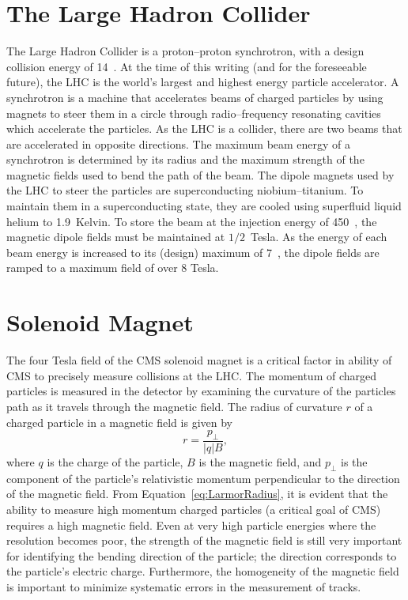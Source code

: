 \section{The Large Hadron Collider}
The Large Hadron Collider is a proton--proton synchrotron, with a design
collision energy of 14~\TeV.  At the time of this writing (and for the
foreseeable future), the LHC is the world's largest and highest energy particle
accelerator. A synchrotron is a machine that accelerates beams of charged
particles by using magnets to steer them in a circle through radio--frequency
resonating cavities which accelerate the particles. As the LHC is a collider,
there are two beams that are accelerated in opposite directions.  The maximum
beam energy of a synchrotron is determined by its radius and the maximum
strength of the magnetic fields used to bend the path of the beam.  The dipole
magnets used by the LHC to steer the particles are superconducting
niobium--titanium.  To maintain them in a superconducting state, they are cooled
using superfluid liquid helium to 1.9~Kelvin.  To store the beam at the
injection energy of 450~\GeV, the magnetic dipole fields must be maintained at
$1/2$~Tesla.  As the energy of each beam energy is increased to its (design)
maximum of 7~\TeV, the dipole fields are ramped to a maximum field of over 8
Tesla.
\section{Solenoid Magnet}
The four Tesla field of the CMS solenoid magnet is a critical factor in ability
of CMS to precisely measure collisions at the LHC\@. The momentum of charged
particles is measured in the detector by examining the curvature of the
particles path as it travels through the magnetic field.  The radius of
curvature $r$ of a charged particle in a magnetic field is given by
\begin{equation}
  r = \frac{p_\perp}{|q| B},
  \label{eq:LarmorRadius}
\end{equation}
where $q$ is the charge of the particle, $B$ is the magnetic field, and
$p_\perp$ is the component of the particle's relativistic momentum perpendicular
to the direction of the magnetic field.  From Equation~\ref{eq:LarmorRadius}, it
is evident that the ability to measure high momentum charged particles (a
critical goal of CMS) requires a high magnetic field.  Even at very high
particle energies where the resolution becomes poor, the strength of the
magnetic field is still very important for identifying the bending direction of
the particle; the direction corresponds to the particle's electric charge.
Furthermore, the homogeneity of the magnetic field is important to minimize
systematic errors in the measurement of tracks.


